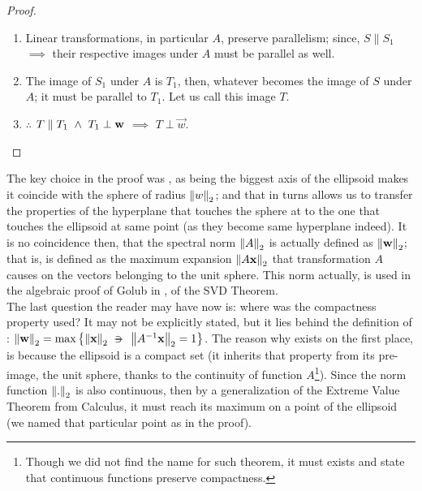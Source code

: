 \begin{proof}
\begin{enumerate}
\item Linear transformations, in particular $A$, preserve parallelism;
  since, $S \parallel S_1$ $\implies$ their respective images under $A$
  must be parallel as well. \\

\item The image of $S_1$ under $A$ is $T_1$, then, whatever becomes
  the image of $S$ under $A$; it must be parallel to $T_1$. Let us
  call this image $T$. \\

\item $\therefore$ $T \parallel T_1 \,\,\land\,\, T_1 \perp \mathbf{w}$
  $\implies$ $T \perp \vec{w}$.  
\end{enumerate}
\end{proof}
\hfill

The key choice in the proof was , as being the biggest axis of
the ellipsoid makes it coincide with the sphere of radius
$\left\lVert w \right\rVert_2$; and that in turns allows us to transfer the properties
of the hyperplane that touches the sphere at  to the one that
touches the ellipsoid at same point (as they become same hyperplane
indeed). It is no coincidence then, that the spectral norm $\left\lVert A \right\rVert_2$
is actually defined as $\left\lVert \mathbf{w} \right\rVert_2$; that is, is defined
as the maximum expansion $\left\lVert A\mathbf{x} \right\rVert_2$ that transformation $A$ causes
on the vectors belonging to the unit sphere. This norm actually, is
used in the algebraic proof of Golub in \cite{golub13}, of the SVD
Theorem. \\ 

The last question the reader may have now is: where was the
compactness property used? It may not be explicitly stated, but it
lies behind the definition of : $\norm{\vec{w}}_2 =
\max\left\{\norm{\vec{x}}_2 \suchthat \norm{\inv{A}\vec{x}}_2 = 1
\right\}$. The reason why  exists 
on the first place, is because the ellipsoid is a compact set (it
inherits that property from its pre-image, the unit sphere, thanks to
the continuity of function $A$\footnote{Though we did not find the
  name for such theorem, it must exists and state that continuous
  functions preserve compactness.}). Since the norm function $\left\lVert . \right\rVert_2$
is also continuous, then by a generalization of the Extreme Value
Theorem from Calculus, it must reach its maximum on a point of the
ellipsoid (we named that particular point as  in the proof). \\

